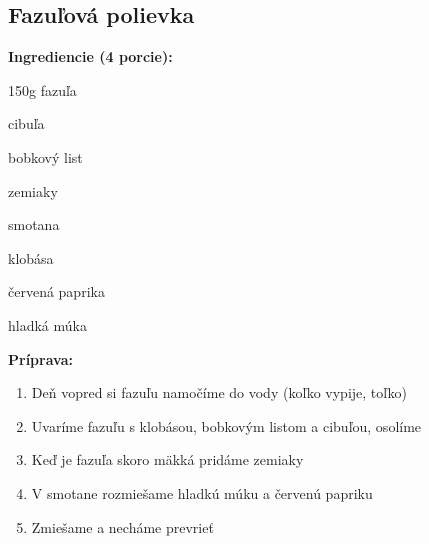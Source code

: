 \setcounter{step}{0}

\subsection{ Fazuľová polievka }

\begin{ingredient}
  
  \def\portions{  }
  \textbf{ {\normalsize Ingrediencie (4 porcie):} }

  \begin{main}
      \item 150g fazuľa
      \item cibuľa
      \item bobkový list
      \item zemiaky
      \item smotana
      \item klobása
      \item červená paprika
      \item hladká múka
  \end{main}
  
\end{ingredient}
\begin{recipe}
\textbf{ {\normalsize Príprava:} }
\begin{enumerate}

  \item{Deň vopred si fazuľu namočíme do vody (koľko vypije, toľko)}
  \item{Uvaríme fazuľu s klobásou, bobkovým listom a cibuľou, osolíme}
  \item{Keď je fazuľa skoro mäkká pridáme zemiaky}
  \item{V smotane rozmiešame hladkú múku a červenú papriku}
  \item{Zmiešame a necháme prevrieť}

\end{enumerate}
\end{recipe}

\begin{notes}
  
\end{notes}	
\clearpage
